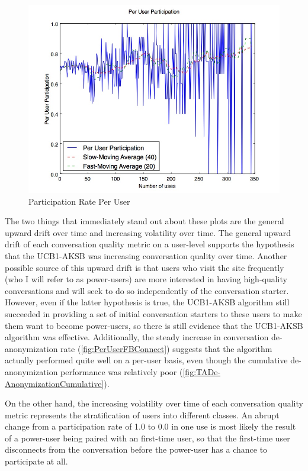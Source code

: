 \begin{figure}[H]
\centering
\includegraphics[trim= 0mm 0mm 0mm 0mm, clip, scale=0.5]{./Figures/PerUserParticipation.jpg}
\caption{Participation Rate Per User}
\label{fig:PerUserParticipation}
\end{figure}

The two things that immediately stand out about these plots are the general upward drift over time and increasing volatility over time. The general upward drift of each conversation quality metric on a user-level supports the hypothesis that the UCB1-AKSB was increasing conversation quality over time. Another possible source of this upward drift is that users who visit the site frequently (who I will refer to as power-users) are more interested in having high-quality conversations and will seek to do so independently of the conversation starter. However, even if the latter hypothesis is true, the UCB1-AKSB algorithm still succeeded in providing a set of initial conversation starters to these users to make them want to become power-users, so there is still evidence that the UCB1-AKSB algorithm was effective. Additionally, the steady increase in conversation de-anonymization rate (\autoref{fig:PerUserFBConnect}) suggests that the algorithm actually performed quite well on a per-user basis, even though the cumulative de-anonymization performance was relatively poor (\autoref{fig:TADe-AnonymizationCumulative}).

On the other hand, the increasing volatility over time of each conversation quality metric represents the stratification of users into different classes. An abrupt change from a participation rate of 1.0 to 0.0 in one use is most likely the result of a power-user being paired with an first-time user, so that the first-time user disconnects from the conversation before the power-user has a chance to participate at all.


